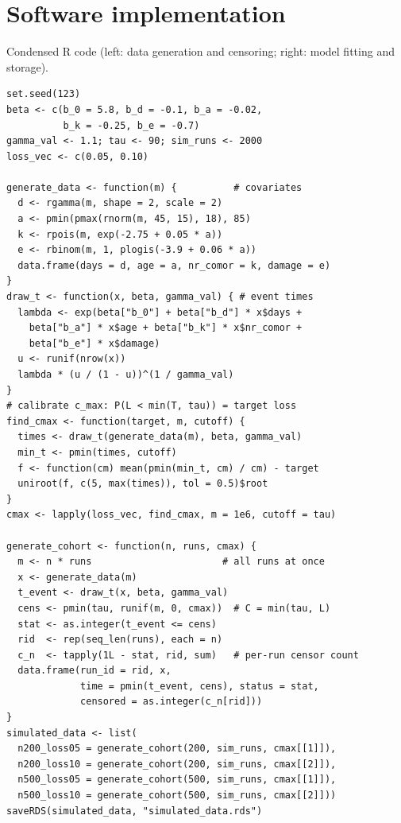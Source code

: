 \documentclass[10pt,a4paper]{article}
\begin{document}
\section*{Software implementation}
Condensed R code (left: data generation and censoring; right: model fitting and storage).\\[2pt]
\begin{minipage}[t]{0.49\textwidth}
\begin{lstlisting}[style=rcode]
set.seed(123)
beta <- c(b_0 = 5.8, b_d = -0.1, b_a = -0.02,
          b_k = -0.25, b_e = -0.7)
gamma_val <- 1.1; tau <- 90; sim_runs <- 2000
loss_vec <- c(0.05, 0.10)

generate_data <- function(m) {          # covariates
  d <- rgamma(m, shape = 2, scale = 2)
  a <- pmin(pmax(rnorm(m, 45, 15), 18), 85)
  k <- rpois(m, exp(-2.75 + 0.05 * a))
  e <- rbinom(m, 1, plogis(-3.9 + 0.06 * a))
  data.frame(days = d, age = a, nr_comor = k, damage = e)
}
draw_t <- function(x, beta, gamma_val) { # event times
  lambda <- exp(beta["b_0"] + beta["b_d"] * x$days +
    beta["b_a"] * x$age + beta["b_k"] * x$nr_comor +
    beta["b_e"] * x$damage)
  u <- runif(nrow(x))
  lambda * (u / (1 - u))^(1 / gamma_val)
}
# calibrate c_max: P(L < min(T, tau)) = target loss
find_cmax <- function(target, m, cutoff) {
  times <- draw_t(generate_data(m), beta, gamma_val)
  min_t <- pmin(times, cutoff)
  f <- function(cm) mean(pmin(min_t, cm) / cm) - target
  uniroot(f, c(5, max(times)), tol = 0.5)$root
}
cmax <- lapply(loss_vec, find_cmax, m = 1e6, cutoff = tau)

generate_cohort <- function(n, runs, cmax) {
  m <- n * runs                       # all runs at once
  x <- generate_data(m)
  t_event <- draw_t(x, beta, gamma_val)
  cens <- pmin(tau, runif(m, 0, cmax))  # C = min(tau, L)
  stat <- as.integer(t_event <= cens)
  rid  <- rep(seq_len(runs), each = n)
  c_n  <- tapply(1L - stat, rid, sum)   # per-run censor count
  data.frame(run_id = rid, x,
             time = pmin(t_event, cens), status = stat,
             censored = as.integer(c_n[rid]))
}
simulated_data <- list(
  n200_loss05 = generate_cohort(200, sim_runs, cmax[[1]]),
  n200_loss10 = generate_cohort(200, sim_runs, cmax[[2]]),
  n500_loss05 = generate_cohort(500, sim_runs, cmax[[1]]),
  n500_loss10 = generate_cohort(500, sim_runs, cmax[[2]]))
saveRDS(simulated_data, "simulated_data.rds")
\end{lstlisting}
\end{minipage}\hfill
\end{document}
